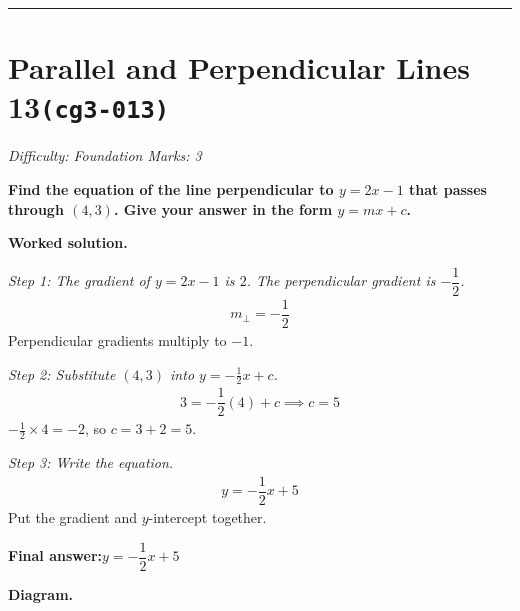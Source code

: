 \documentclass[11pt]{article}
\newcommand{\question}[1]{\par\medskip\noindent\textbf{#1}\par}
\begin{document}
\medskip\hrule

\section*{Parallel and Perpendicular Lines 13\quad\small\texttt{(cg3-013)}}
\textit{Difficulty: Foundation \quad\textbar\quad Marks: 3}

\question{Find the equation of the line perpendicular to \( y = 2x - 1 \) that passes through \( (4, 3) \). Give your answer in the form \( y = mx + c \).}

\textbf{Worked solution.}

\textit{Step 1: The gradient of \( y = 2x - 1 \) is \( 2 \). The perpendicular gradient is \( -\dfrac{1}{2} \).}
\[\begin{gathered}
m_\perp = -\dfrac{1}{2}
\end{gathered}\]
Perpendicular gradients multiply to \( -1 \).

\textit{Step 2: Substitute \( (4, 3) \) into \( y = -\frac{1}{2}x + c \).}
\[\begin{gathered}
3 = -\dfrac{1}{2}(4) + c \implies c = 5
\end{gathered}\]
\( -\tfrac{1}{2} \times 4 = -2 \), so \( c = 3 + 2 = 5 \).

\textit{Step 3: Write the equation.}
\[\begin{gathered}
y = -\dfrac{1}{2}x + 5
\end{gathered}\]
Put the gradient and \( y \)-intercept together.

\begin{answerbox}
\textbf{Final answer:}\quad \(\displaystyle y = -\dfrac{1}{2}x + 5\)
\end{answerbox}
\textbf{Diagram.}
\end{document}
